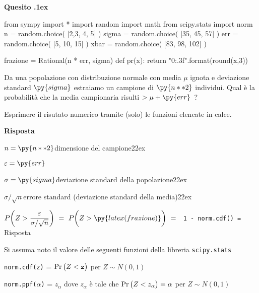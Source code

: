 \documentclass[11pt,twoside,a4paper]{article}
\def\Pr{{\rm Pr\,}}
\newcounter{quesito}
\newenvironment{question}{\addtocounter{quesito}{1}\bigskip\bigskip\par\textbf{Quesito \thequesito.\kern1ex}}{\vspace{\parskip}}
\newenvironment{answer}{\par\textbf{Risposta\quad}}{\vspace{\parskip}}
\begin{document}
\clearpage
\begin{question} %
\begin{pycode}
from sympy import *
import random
import math
from scipy.stats import norm
n = random.choice( [2,3, 4, 5] )
sigma = random.choice( [35, 45, 57] )
err = random.choice( [5, 10, 15] )
xbar = random.choice( [83, 98, 102] )

frazione =  Rational(n * err, sigma)
def pr(x):
    return "{0:.3f}".format(round(x,3))

\end{pycode}
Da una popolazione con distribuzione normale con media $\mu$ ignota e deviazione standard $\py{sigma}$ estraiamo un campione di $\py{n**2}$ individui. Qual è la probabilità che la media campionaria risulti $>\mu+ \py{err}$~? 
    
Esprimere il risutato numerico tramite (solo) le funzioni elencate in calce.

\begin{answer}
  
  $n = \py{n**2}$\hfill dimensione del campione\kern22ex
  
  $\varepsilon = \py{err}$ 
  
  $\sigma = \py{sigma}$\hfill deviazione standard della popolazione\kern22ex
  
  $\sigma/\sqrt{n}$\hfill errore standard (deviazione standard della media)\kern22ex
  
  $\displaystyle P\bigg(Z>\dfrac {\varepsilon}{\sigma/\sqrt{n}}\bigg)\ =\ P\bigg(Z>\py{latex(frazione)}\bigg)\ =\ ${\color{blue}\tt\ 1 - norm.cdf()}{\tt\ =  }{\color{blue}\hfill Risposta}

\end{answer}
\end{question}


\vfill
\hrulefill

Si assuma noto il valore delle seguenti funzioni della libreria {\tt scipy.stats\/}

{\tt norm.cdf(z)} = $\Pr\big(Z<{\tt z}\big)$ per $Z\sim N(0,1)$ 

{\tt norm.ppf($\alpha$)} = $z_\alpha$ dove $z_\alpha$ è tale che $\Pr\big(Z<z_\alpha\big)=\alpha$ per $Z\sim N(0,1)$ 
\end{document}
